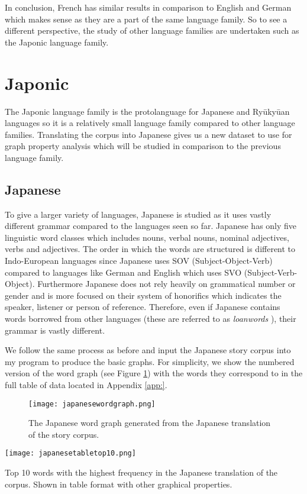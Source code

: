 In conclusion, French has similar results in comparison to English and German which makes sense as they are a part of the same language family. So to see a different perspective, the study of other language families are undertaken such as the Japonic language family.

\section{Japonic}
The Japonic language family is the protolanguage for Japanese and Ryūkyūan languages \cite{vovin2017origins} so it is a relatively small language family compared to other language families. Translating the corpus into Japanese gives us a new dataset to use for graph property analysis which will be studied in comparison to the previous language family.
\subsection{Japanese}
To give a larger variety of languages, Japanese is studied as it uses vastly different grammar compared to the languages seen so far. Japanese has only five linguistic word classes which includes nouns, verbal nouns, nominal adjectives, verbs and adjectives. The order in which the words are structured is different to Indo-European languages since Japanese uses SOV (Subject-Object-Verb) compared to languages like German and English which uses SVO (Subject-Verb-Object). Furthermore Japanese does not rely heavily on grammatical number or gender and is more focused on their system of honorifics which indicates the speaker, listener or person of reference. Therefore, even if Japanese contains words borrowed from other languages (these are referred to as \emph{loanwords} \cite{miura1979influence}), their grammar is vastly different. 

We follow the same process as before and input the Japanese story corpus into my program to produce the basic graphs. For simplicity, we show the numbered version of the word graph (see Figure \ref{fig:jpgraph}) with the words they correspond to in the full table of data located in Appendix \ref{app:}.

\begin{figure}[!htb]
\centering
\texttt{[image: japanesewordgraph.png]}
\caption{The Japanese word graph generated from the Japanese translation of the story corpus.}
\label{fig:jpgraph}
\end{figure}

\begin{table}[!htb]
\centering
\texttt{[image: japanesetabletop10.png]}
\caption{Top 10 words with the highest frequency in the Japanese translation of the corpus. Shown in table format with other graphical properties. }
\label{table:japanesetop}
\end{table}

